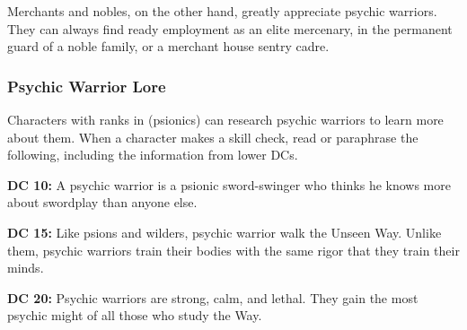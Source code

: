 Merchants and nobles, on the other hand, greatly appreciate psychic warriors. They can always find ready employment as an elite mercenary, in the permanent guard of a noble family, or a merchant house sentry cadre.

\subsubsection{Psychic Warrior Lore}

Characters with ranks in  (psionics) can research psychic warriors to learn more about them. When a character makes a skill check, read or paraphrase the following, including the information from lower DCs.

\textbf{DC 10:} A psychic warrior is a psionic sword-swinger who thinks he knows more about swordplay than anyone else.

\textbf{DC 15:} Like psions and wilders, psychic warrior walk the Unseen Way. Unlike them, psychic warriors train their bodies with the same rigor that they train their minds.

\textbf{DC 20:} Psychic warriors are strong, calm, and lethal. They gain the most psychic might of all those who study the Way.

